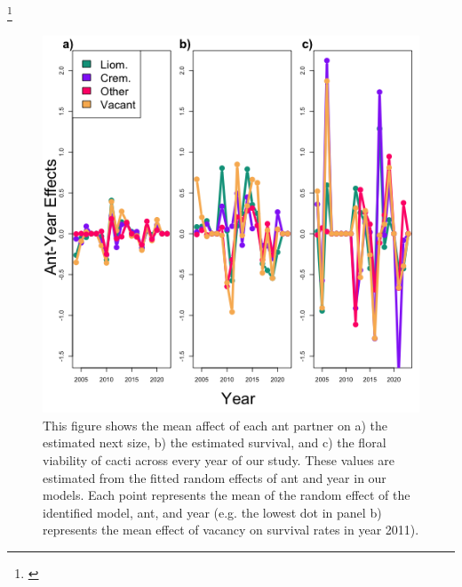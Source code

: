 \documentclass[11pt]{article}
\newcommand{\tom}[2]{{\color{red}{#1}}\footnote{\textit{\color{red}{#2}}}}
\begin{document}
\tom{Inter-annual variation results}{I think the text you had for this did not directly address the synchrony hypothesis, and it may be more informative to look at correlation coefficients rather than the time series, which are hard to make heads or tails of.}
\begin{figure}[H]
	\includegraphics[width=0.95\linewidth]{Figures/year_ant_timeseries.png}
	\caption{This figure shows the mean affect of each ant partner on a) the estimated next size, b) the estimated survival, and c) the floral viability of cacti across every year of our study. These values are estimated from the fitted random effects of ant and year in our models. Each point represents the mean of the random effect of the identified model, ant, and year (e.g. the lowest dot in panel b) represents the mean effect of vacancy on survival rates in year 2011).}
	\label{fig:Annual_Ant}
\end{figure}
\end{document}
